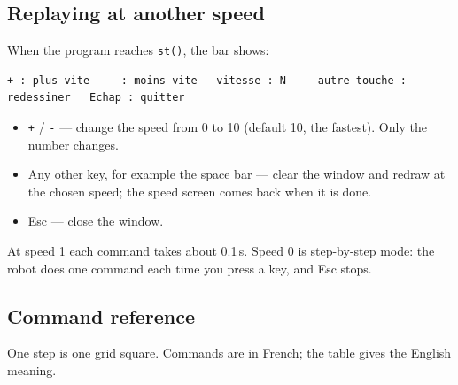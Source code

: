 \documentclass[11pt,a4paper]{article}
\newcommand{\kbd}[1]{\texttt{#1}}
\begin{document}
\subsection{Replaying at another speed}\label{sec:replay}
When the program reaches \kbd{st()}, the bar shows:
\begin{lstlisting}
+ : plus vite   - : moins vite   vitesse : N     autre touche : redessiner   Echap : quitter
\end{lstlisting}
\begin{itemize}
\item \kbd{+} / \kbd{-} --- change the speed from 0 to 10 (default 10, the
  fastest). Only the number changes.
\item Any other key, for example the space bar --- clear the window and
  redraw at the chosen speed; the speed screen comes back when it is done.
\item Esc --- close the window.
\end{itemize}
At speed 1 each command takes about 0.1\,s. Speed 0 is step-by-step mode:
the robot does one command each time you press a key, and Esc stops.

\subsection{Command reference}
One step is one grid square. Commands are in French; the table gives the
English meaning.
\end{document}
